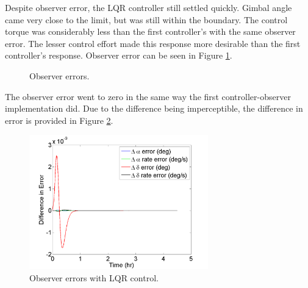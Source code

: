 \documentclass[]{aiaa-tc}%
\begin{document}
	Despite observer error, the LQR controller still settled quickly. Gimbal angle came very close to the limit, but was still within the boundary. The control torque was considerably less than the first controller's with the same observer error. The lesser control effort made this response more desirable than the first controller's response. Observer error can be seen in Figure \ref{fig:ControllerLQRObsErrors}.

	\begin{figure}[H]
		\centering
		\caption{Observer errors. }
		\label{fig:ControllerLQRObsErrors}
	\end{figure}	

	The observer error went to zero in the same way the first controller-observer implementation did. Due to the difference being imperceptible, the difference in error is provided in Figure \ref{fig:DiffInError}.

	\begin{figure}[H]
		\centering
			\includegraphics[width = 7.75cm]{Ctrl1_LQR_error_diff_ObsErr.png}
		\caption{Observer errors with LQR control. }
		\label{fig:DiffInError}
	\end{figure}	
\end{document}
